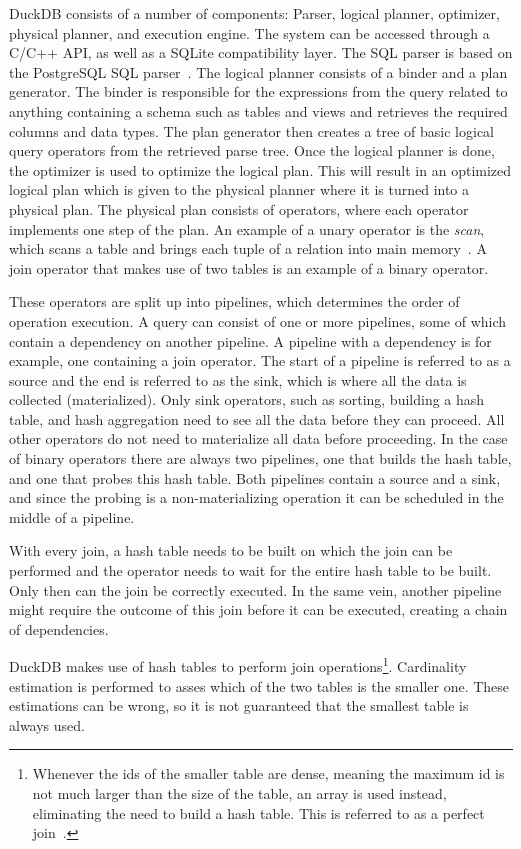 DuckDB consists of a number of components: Parser, logical planner, optimizer, physical planner, and execution engine. 
The system can be accessed through a C/C++ API, as well as a SQLite compatibility layer. 
The SQL parser is based on the PostgreSQL SQL parser~\cite{DBLP:conf/sigmod/RaasveldtM19}.
The logical planner consists of a binder and a plan generator.
The binder is responsible for the expressions from the query related to anything containing a schema such as tables and views and retrieves the required columns and data types. 
The plan generator then creates a tree of basic logical query operators from the retrieved parse tree. 
Once the logical planner is done, the optimizer is used to optimize the logical plan. 
This will result in an optimized logical plan which is given to the physical planner where it is turned into a physical plan.
The physical plan consists of operators, where each operator implements one step of the plan. 
An example of a unary operator is the \textit{scan}, which scans a table and brings each tuple of a relation into main memory~\cite{DBLP:books/daglib/0020812}.
A join operator that makes use of two tables is an example of a binary operator.

These operators are split up into pipelines, which determines the order of operation execution.
A query can consist of one or more pipelines, some of which contain a dependency on another pipeline. 
A pipeline with a dependency is for example, one containing a join operator. 
The start of a pipeline is referred to as a source and the end is referred to as the sink, which is where all the data is collected (materialized).
Only sink operators, such as sorting, building a hash table, and hash aggregation need to see all the data before they can proceed. All other operators do not need to materialize all data before proceeding. 
In the case of binary operators there are always two pipelines, one that builds the hash table, and one that probes this hash table. Both pipelines contain a source and a sink, and since the probing is a non-materializing operation it can be scheduled in the middle of a pipeline. 


With every join, a hash table needs to be built on which the join can be performed and the operator needs to wait for the entire hash table to be built.  
Only then can the join be correctly executed.
In the same vein, another pipeline might require the outcome of this join before it can be executed, creating a chain of dependencies.

DuckDB makes use of hash tables to perform join operations\footnote{Whenever the ids of the smaller table are dense, meaning the maximum id is not much larger than the size of the table, an array is used instead, eliminating the need to build a hash table. This is referred to as a perfect join~\cite{DBLP:conf/sigmod/AbadiMH08}.}. 
Cardinality estimation is performed to asses which of the two tables is the smaller one. These estimations can be wrong, so it is not guaranteed that the smallest table is always used. 



